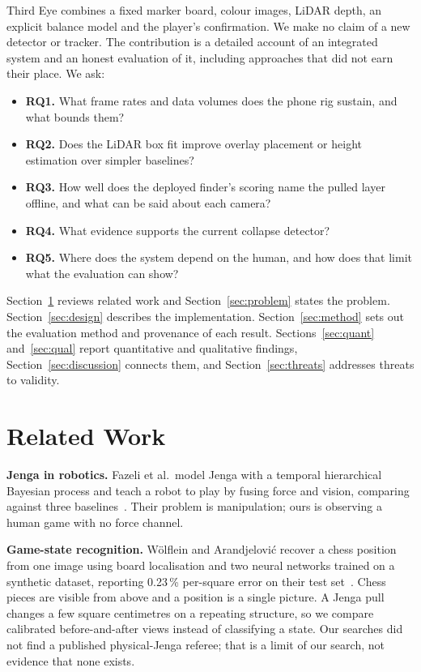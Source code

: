 \documentclass[conference,10pt]{IEEEtran}
\begin{document}
Third Eye combines a fixed marker board, colour images, LiDAR depth, an explicit balance model and the player's confirmation. We make no claim of a new detector or tracker. The contribution is a detailed account of an integrated system and an honest evaluation of it, including approaches that did not earn their place. We ask:
\begin{itemize}
\item \textbf{RQ1.} What frame rates and data volumes does the phone rig sustain, and what bounds them?
\item \textbf{RQ2.} Does the LiDAR box fit improve overlay placement or height estimation over simpler baselines?
\item \textbf{RQ3.} How well does the deployed finder's scoring name the pulled layer offline, and what can be said about each camera?
\item \textbf{RQ4.} What evidence supports the current collapse detector?
\item \textbf{RQ5.} Where does the system depend on the human, and how does that limit what the evaluation can show?
\end{itemize}

Section~\ref{sec:related} reviews related work and Section~\ref{sec:problem} states the problem. Section~\ref{sec:design} describes the implementation. Section~\ref{sec:method} sets out the evaluation method and provenance of each result. Sections~\ref{sec:quant} and~\ref{sec:qual} report quantitative and qualitative findings, Section~\ref{sec:discussion} connects them, and Section~\ref{sec:threats} addresses threats to validity.

\section{Related Work}\label{sec:related}
\textbf{Jenga in robotics.} Fazeli et al.\ model Jenga with a temporal hierarchical Bayesian process and teach a robot to play by fusing force and vision, comparing against three baselines~\cite{fazeli2019}. Their problem is manipulation; ours is observing a human game with no force channel.

\textbf{Game-state recognition.} Wölflein and Arandjelović recover a chess position from one image using board localisation and two neural networks trained on a synthetic dataset, reporting 0.23\,\% per-square error on their test set~\cite{wolflein2021}. Chess pieces are visible from above and a position is a single picture. A Jenga pull changes a few square centimetres on a repeating structure, so we compare calibrated before-and-after views instead of classifying a state. Our searches did not find a published physical-Jenga referee; that is a limit of our search, not evidence that none exists.
\end{document}
